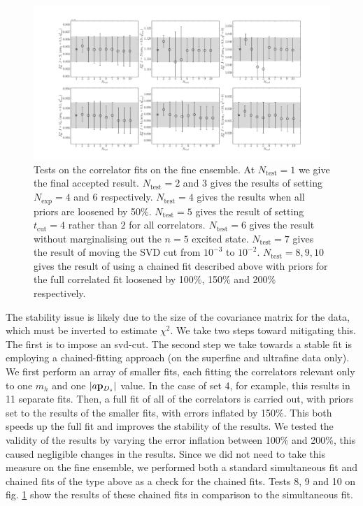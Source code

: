 \begin{figure}[htb!]
    \hspace{-85pt}
    \includegraphics[width=1.4\textwidth]{images/BsDs/finecorr_fittest.pdf}
    \caption{Tests on the correlator fits on the fine ensemble. At $N_{\text{test}}=1$ we give the final accepted result. $N_{\text{test}}=2$ and $3$ gives the results of setting $N_{\text{exp}}=4$ and $6$ respectively. $N_{\text{test}}=4$ gives the results when all priors are loosened by 50\%. $N_{\text{test}}=5$ gives the result of setting $t_{\text{cut}}=4$ rather than $2$ for all correlators. $N_{\text{test}}=6$ gives the result without marginalising out the $n=5$ excited state. $N_{\text{test}}=7$ gives the result of moving the SVD cut from $10^{-3}$ to $10^{-2}$. $N_{\text{test}}=8,9,10$ gives the result of using a chained fit described above with priors for the full correlated fit loosened by 100\%, 150\% and 200\% respectively. \label{fig:corr_tests_BsDs}}
\end{figure}

The stability issue is likely due to the size of the covariance matrix for the data, which must be inverted to estimate $\chi^2$. We take two steps toward mitigating this. The first is to impose an svd-cut. The second step we take towards a stable fit is employing a chained-fitting approach (on the superfine and ultrafine data only). We first perform an array of smaller fits, each fitting the correlators relevant only to one $m_h$ and one $|a{\bf{p}}_{D_s}|$ value. In the case of set 4, for example, this results in 11 separate fits. Then, a full fit of all of the correlators is carried out, with priors set to the results of the smaller fits, with errors inflated by 150\%. This both speeds up the full fit and improves the stability of the results. We tested the validity of the results by varying the error inflation between 100\% and 200\%, this caused negligible changes in the results. Since we did not need to take this measure on the fine ensemble, we performed both a standard simultaneous fit and chained fits of the type above as a check for the chained fits. Tests 8, 9 and 10 on fig. \ref{fig:corr_tests_BsDs} show the results of these chained fits in comparison to the simultaneous fit.

